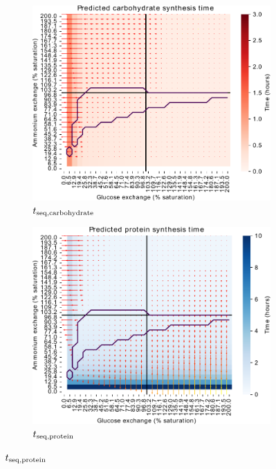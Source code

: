 \begin{figure}
  \begin{subfigure}[t]{0.45\textwidth}
  \centering
    \includegraphics[width=\linewidth]{ec_grid_glc_amm_carb}
    \caption{
      $t_{\mathrm{seq},\mathrm{carbohydrate}}$
    }
    \label{fig:model-grid-glc-carb}
  \end{subfigure}%
  \begin{subfigure}[t]{0.45\textwidth}
  \centering
    \includegraphics[width=\linewidth]{ec_grid_glc_amm_prot}
    \caption{
      $t_{\mathrm{seq},\mathrm{protein}}$
    }
    \label{fig:model-grid-glc-prot}
  \end{subfigure}


\end{figure}
